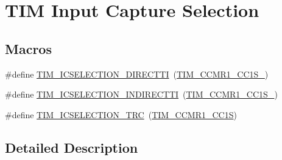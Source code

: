 \hypertarget{group___t_i_m___input___capture___selection}{\section{T\-I\-M Input Capture Selection}
\label{group___t_i_m___input___capture___selection}
}
\subsection*{Macros}
\begin{DoxyCompactItemize}
\item 
\#define \hyperlink{group___t_i_m___input___capture___selection_gac3be2fd9c576e84e0ebcfc7b3c0773a3}{T\-I\-M\-\_\-\-I\-C\-S\-E\-L\-E\-C\-T\-I\-O\-N\-\_\-\-D\-I\-R\-E\-C\-T\-T\-I}~(\hyperlink{group___peripheral___registers___bits___definition_ga1e4968b5500d58d1aebce888da31eb5d}{T\-I\-M\-\_\-\-C\-C\-M\-R1\-\_\-\-C\-C1\-S\-\_})
\item 
\#define \hyperlink{group___t_i_m___input___capture___selection_gab9754d4318abcd7fe725e3ee2e4496d4}{T\-I\-M\-\_\-\-I\-C\-S\-E\-L\-E\-C\-T\-I\-O\-N\-\_\-\-I\-N\-D\-I\-R\-E\-C\-T\-T\-I}~(\hyperlink{group___peripheral___registers___bits___definition_ga299207b757f31c9c02471ab5f4f59dbe}{T\-I\-M\-\_\-\-C\-C\-M\-R1\-\_\-\-C\-C1\-S\-\_})
\item 
\#define \hyperlink{group___t_i_m___input___capture___selection_ga9e0191bbf1a82dd9150b9283c39276e7}{T\-I\-M\-\_\-\-I\-C\-S\-E\-L\-E\-C\-T\-I\-O\-N\-\_\-\-T\-R\-C}~(\hyperlink{group___peripheral___registers___bits___definition_ga95291df1eaf532c5c996d176648938eb}{T\-I\-M\-\_\-\-C\-C\-M\-R1\-\_\-\-C\-C1\-S})
\end{DoxyCompactItemize}


\subsection{Detailed Description}


